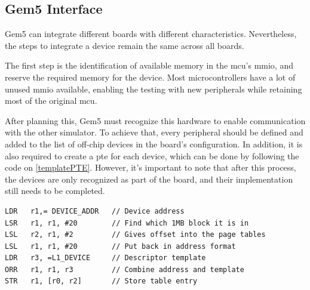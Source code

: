 \subsection{Gem5 Interface}

Gem5 can integrate different boards with different characteristics. Nevertheless, the steps to integrate a device remain the same across 
all boards. 

The first step is the identification of available memory in the \gls{mcu}'s \gls{mmio}, and reserve the required memory for the device. 
Most microcontrollers have a lot of unused \gls{mmio} available, enabling the testing with new peripherals while retaining most of the 
original \gls{mcu}.

After planning this, Gem5 must recognize this hardware to enable communication with the other simulator. 
To achieve that, every peripheral should be defined and added to the list of off-chip devices in the 
board's configuration. In addition, it is also required to create a \gls{pte} for each device, which can be done by following the
code on \ref{templatePTE}. However, it's important to note that after this process, the devices are only recognized as part of the 
board, and their implementation still needs to be completed.

\hspace{1cm}

\begin{lstlisting}[style=customasm, caption={Template for a \gls{pte}}, label=templatePTE]
LDR   r1,= DEVICE_ADDR	 // Device address
LSR   r1, r1, #20        // Find which 1MB block it is in
LSL   r2, r1, #2         // Gives offset into the page tables
LSL   r1, r1, #20        // Put back in address format
LDR   r3, =L1_DEVICE     // Descriptor template
ORR   r1, r1, r3         // Combine address and template
STR   r1, [r0, r2]       // Store table entry
\end{lstlisting}


